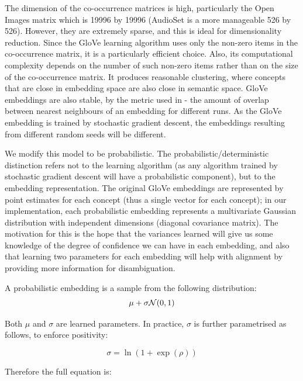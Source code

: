 The dimension of the co-occurrence matrices is high, particularly the Open Images matrix which is 19996 by 19996 (AudioSet is a more manageable 526 by 526). However, they are extremely sparse, and this is ideal for dimensionality reduction. Since the  GloVe learning algorithm uses only the non-zero items in the co-occurrence matrix, it is a particularly efficient choice. Also, its computational complexity depends on the number of such non-zero items rather than on the size of the co-occurrence matrix. It produces reasonable clustering, where concepts that are close in embedding space are also close in semantic space. %
GloVe embeddings are also stable, by the metric used in \cite{WordEmbeddingStability}- the amount of overlap between nearest neighbours of an embedding for different runs. As the GloVe embedding is trained by stochastic gradient descent, the embeddings resulting from different random seeds will be different.

We modify this model to be probabilistic.  The probabilistic/deterministic distinction refers not to the learning algorithm (as any algorithm trained by stochastic gradient descent will have a probabilistic component), but to the embedding representation. The original GloVe embeddings are represented by point estimates for each concept (thus a single vector for each concept); in our implementation, each probabilistic embedding represents a multivariate Gaussian distribution with independent dimensions (diagonal covariance matrix). The motivation for this is the hope that the variances learned will give us some knowledge of the degree of confidence we can have in each embedding, and also that learning two parameters for each embedding will help with alignment by providing more information for disambiguation. 

A probabilistic embedding is a sample from the following distribution:
\begin{equation*}
    \mu + \sigma \mathcal{N}(0, 1)
\end{equation*}

Both $\mu$ and $\sigma$ are learned parameters. In practice, $\sigma$ is further parametrised as follows, to enforce positivity:

\begin{equation*}
    \sigma = \ln (1 + \exp (\rho))
\end{equation*}

Therefore the full equation is:

